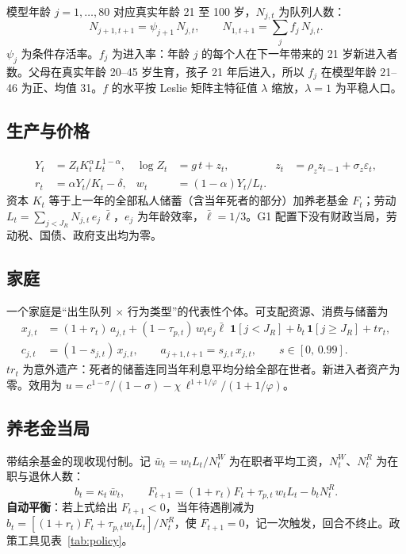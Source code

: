 \documentclass[UTF8,11pt,a4paper]{ctexart}
\begin{document}
模型年龄 $j=1,\dots,80$ 对应真实年龄 21 至 100 岁，$N_{j,t}$ 为队列人数：
\begin{equation}
  N_{j+1,t+1} = \psi_{j+1}\,N_{j,t}, \qquad N_{1,t+1} = \sum_{j} f_j\,N_{j,t}.
\end{equation}
$\psi_j$ 为条件存活率。$f_j$ 为进入率：年龄 $j$ 的每个人在下一年带来的 21 岁新进入者数。父母在真实年龄 20--45 岁生育，孩子 21 年后进入，所以 $f_j$ 在模型年龄 21--46 为正、均值 31。$f$ 的水平按 Leslie 矩阵主特征值 $\lambda$ 缩放，$\lambda=1$ 为平稳人口。

\subsection{生产与价格}

\begin{align}
  Y_t &= Z_t K_t^{\alpha} L_t^{1-\alpha}, & \log Z_t &= g\,t + z_t, & z_t &= \rho_z z_{t-1} + \sigma_z \varepsilon_t,\\
  r_t &= \alpha Y_t/K_t - \delta, & w_t &= (1-\alpha) Y_t/L_t. & &
\end{align}
资本 $K_t$ 等于上一年的全部私人储蓄（含当年死者的部分）加养老基金 $F_t$；劳动 $L_t=\sum_{j<J_R} N_{j,t}\,e_j\,\bar\ell$，$e_j$ 为年龄效率，$\bar\ell=1/3$。G1 配置下没有财政当局，劳动税、国债、政府支出均为零。

\subsection{家庭}

一个家庭是“出生队列 $\times$ 行为类型”的代表性个体。可支配资源、消费与储蓄为
\begin{align}
  x_{j,t} &= (1+r_t)\,a_{j,t} + (1-\tau_{p,t})\,w_t e_j \bar\ell\;\mathbf{1}[j<J_R] + b_t\,\mathbf{1}[j\ge J_R] + tr_t,\\
  c_{j,t} &= (1-s_{j,t})\,x_{j,t}, \qquad a_{j+1,t+1} = s_{j,t}\,x_{j,t}, \qquad s\in[0,\,0.99].
\end{align}
$tr_t$ 为意外遗产：死者的储蓄连同当年利息平均分给全部在世者。新进入者资产为零。效用为 $u = c^{1-\sigma}/(1-\sigma) - \chi\,\ell^{1+1/\varphi}/(1+1/\varphi)$。

\subsection{养老金当局}

带结余基金的现收现付制。记 $\bar w_t = w_t L_t / N^W_t$ 为在职者平均工资，$N^W_t$、$N^R_t$ 为在职与退休人数：
\begin{equation}
  b_t = \kappa_t\,\bar w_t, \qquad F_{t+1} = (1+r_t)F_t + \tau_{p,t}\,w_t L_t - b_t N^R_t .
\end{equation}
\textbf{自动平衡}：若上式给出 $F_{t+1}<0$，当年待遇削减为 $b_t = [(1+r_t)F_t + \tau_{p,t} w_t L_t]/N^R_t$，使 $F_{t+1}=0$，记一次触发，回合不终止。政策工具见表~\ref{tab:policy}。
\end{document}

